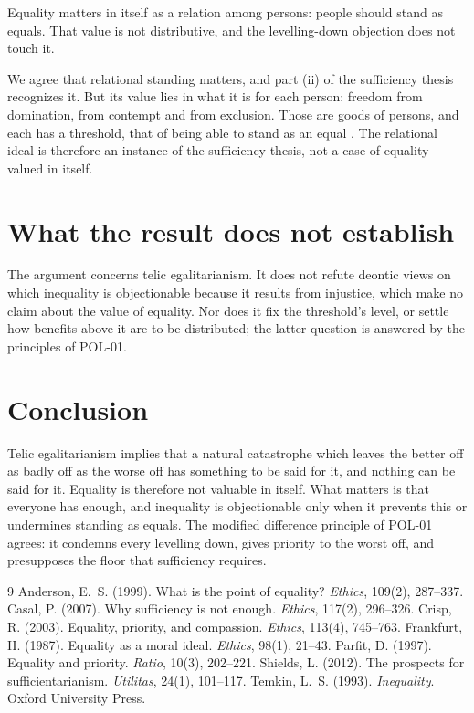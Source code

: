 \documentclass{situationist-preprint}
\begin{document}
\begin{objection}
Equality matters in itself as a relation among persons: people should stand as equals. That value is not distributive, and the levelling-down objection does not touch it.
\end{objection}

\begin{reply}
We agree that relational standing matters, and part (ii) of the sufficiency thesis recognizes it. But its value lies in what it is for each person: freedom from domination, from contempt and from exclusion. Those are goods of persons, and each has a threshold, that of being able to stand as an equal \citep{Anderson1999}. The relational ideal is therefore an instance of the sufficiency thesis, not a case of equality valued in itself.
\end{reply}

\section{What the result does not establish}

The argument concerns telic egalitarianism. It does not refute deontic views on which inequality is objectionable because it results from injustice, which make no claim about the value of equality. Nor does it fix the threshold's level, or settle how benefits above it are to be distributed; the latter question is answered by the principles of POL-01.

\section{Conclusion}

Telic egalitarianism implies that a natural catastrophe which leaves the better off as badly off as the worse off has something to be said for it, and nothing can be said for it. Equality is therefore not valuable in itself. What matters is that everyone has enough, and inequality is objectionable only when it prevents this or undermines standing as equals. The modified difference principle of POL-01 agrees: it condemns every levelling down, gives priority to the worst off, and presupposes the floor that sufficiency requires.

\begin{thebibliography}{9}\small
{} Anderson, E.~S. (1999). What is the point of equality? \emph{Ethics}, 109(2), 287--337.
 Casal, P. (2007). Why sufficiency is not enough. \emph{Ethics}, 117(2), 296--326.
 Crisp, R. (2003). Equality, priority, and compassion. \emph{Ethics}, 113(4), 745--763.
 Frankfurt, H. (1987). Equality as a moral ideal. \emph{Ethics}, 98(1), 21--43.
 Parfit, D. (1997). Equality and priority. \emph{Ratio}, 10(3), 202--221.
 Shields, L. (2012). The prospects for sufficientarianism. \emph{Utilitas}, 24(1), 101--117.
 Temkin, L.~S. (1993). \emph{Inequality}. Oxford University Press.
\end{thebibliography}
\end{document}
